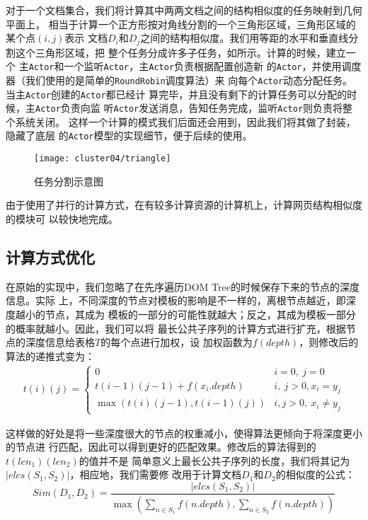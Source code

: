 对于一个文档集合，我们将计算其中两两文档之间的结构相似度的任务映射到几何平面上，
相当于计算一个正方形按对角线分割的一个三角形区域，三角形区域的某个点$(i, j)$表示
文档$D_i$和$D_j$之间的结构相似度。我们用等距的水平和垂直线分割这个三角形区域，把
整个任务分成许多子任务，如所示。计算的时候，建立一个
主\texttt{Actor}和一个监听\texttt{Actor}，主\texttt{Actor}负责根据配置创造新
的\texttt{Actor}，并使用调度器（我们使用的是简单的\texttt{RoundRobin}调度算法）来
向每个\texttt{Actor}动态分配任务。当主\texttt{Actor}创建的\texttt{Actor}都已经计
算完毕，并且没有剩下的计算任务可以分配的时候，主\texttt{Actor}负责向监
听\texttt{Actor}发送消息，告知任务完成，监听\texttt{Actor}则负责将整个系统关闭。
这样一个计算的模式我们后面还会用到，因此我们将其做了封装，隐藏了底层
的\texttt{Actor}模型的实现细节，便于后续的使用。
\begin{figure}
  \centering
  \texttt{[image: cluster04/triangle]}
  \caption{任务分割示意图}
  \label{cluster:fig:triangle}
\end{figure}

由于使用了并行的计算方式，在有较多计算资源的计算机上，计算网页结构相似度的模块可
以较快地完成。

\subsection{计算方式优化}
在原始的实现中，我们忽略了在先序遍历DOM Tree的时候保存下来的节点的深度信息。实际
上，不同深度的节点对模板的影响是不一样的，离根节点越近，即深度越小的节点，其成为
模板的一部分的可能性就越大；反之，其成为模板一部分的概率就越小。因此，我们可以将
最长公共子序列的计算方式进行扩充，根据节点的深度信息给表格$T$的每个点进行加权，设
加权函数为$f(depth)$，则修改后的算法的递推式变为：
\begin{eqnarray}
  t(i)(j) =
  \begin{cases}
    0 & i = 0,\: j = 0\\
    t(i-1)(j-1) + f(x_i.depth) & i,\: j > 0, x_i=y_j\\
    \max(t(i)(j-1), t(i-1)(j)) & i, j > 0,\: x_i \ne y_j
  \end{cases}
\end{eqnarray}

这样做的好处是将一些深度很大的节点的权重减小，使得算法更倾向于将深度更小的节点进
行匹配，因此可以得到更好的匹配效果。修改后的算法得到的$t(len_1)(len_2)$的值并不是
简单意义上最长公共子序列的长度，我们将其记为$|elcs(S_1,S_2)|$，相应地，我们需要修
改用于计算文档$D_1$和$D_2$的相似度的公式：
\[
Sim(D_1,D_2)=\frac{|elcs(S_1,S_2)|}{\max(\sum\limits_{n\in
    S_1}{f(n.depth)},\sum\limits_{n\in S_2}{f(n.depth)})}
\]
